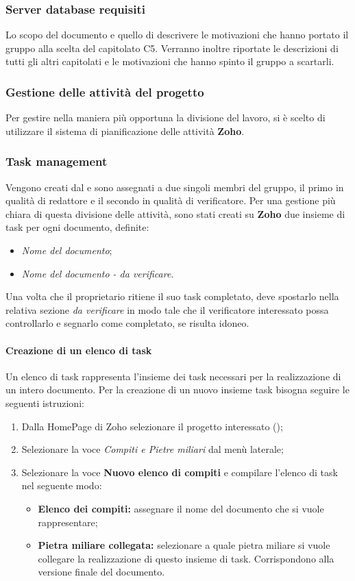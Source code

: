 \subsubsection{Server database requisiti}
Lo scopo del documento e quello di descrivere le motivazioni che hanno portato il gruppo alla scelta del capitolato C5.
Verranno inoltre riportate le descrizioni di tutti gli altri capitolati e le motivazioni che hanno spinto il gruppo a scartarli.

\subsubsection{Gestione delle attività del progetto}
Per gestire nella maniera più opportuna la divisione del lavoro, si è scelto di 
utilizzare il sistema di pianificazione delle attività \textbf{Zoho}.

\subsubsection{Task management}
Vengono creati dal \textsl{\RdP} e sono assegnati a due singoli membri del gruppo, 
il primo in qualità di redattore e il secondo in qualità di verificatore.
Per una gestione più chiara di questa divisione delle attività, sono stati creati su \textbf{Zoho} 
due insieme di task per ogni documento, definite:
\begin{itemize}
  \item \textsl{Nome del documento};
  \item \textsl{Nome del documento - da verificare}.
\end{itemize}
Una volta che il proprietario ritiene il suo task completato, deve spostarlo 
nella relativa sezione \textsl{da verificare} in modo tale che il verificatore 
interessato possa controllarlo e segnarlo come completato, se risulta idoneo. 

\paragraph{Creazione di un elenco di task}
Un elenco di task rappresenta l'insieme dei task necessari per la realizzazione di un intero documento.
Per la creazione di un nuovo insieme task bisogna seguire le seguenti istruzioni:
\begin{enumerate}
   \item Dalla HomePage di Zoho selezionare il progetto interessato (\progetto);
  \item Selezionare la voce \textsl{Compiti e Pietre miliari} dal menù laterale;
   \item Selezionare la voce \textbf{Nuovo elenco di compiti} e compilare l'elenco di task nel 
  seguente modo:
  \begin{itemize}
    \item \textbf{Elenco dei compiti:} assegnare il nome del documento che si 
    vuole rappresentare;
    \item \textbf{Pietra miliare collegata:} selezionare a quale pietra miliare si 
    vuole collegare la realizzazione di questo insieme di task. Corrispondono alla 
    versione finale del documento.
  \end{itemize}
\end{enumerate}
